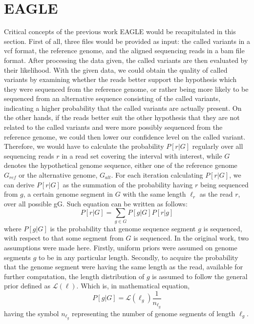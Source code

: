 \documentclass{PHlab-thesis}
\begin{document}
\section{EAGLE}
Critical concepts of the previous work EAGLE would be recapitulated in this section. First of all, three files would be provided as input: the called variants in a vcf format, the reference genome, and the aligned sequencing reads in a bam file format. After processing the data given, the called variants are then evaluated by their likelihood. With the given data, we could obtain the quality of called variants by examining whether the reads better support the hypothesis which they were sequenced from the reference genome, or rather being more likely to be sequenced from an alternative sequence consisting of the called variants, indicating a higher probability that the called variants are actually present. On the other hands, if the reads better suit the other hypothesis that they are not related to the called variants and were more possibly sequenced from the reference genome, we could then lower our confidence level on the called variant. Therefore, we would have to calculate the probability $P[r|G]$ regularly over all sequencing reads $r$ in a read set covering the interval with interest, while $G$ denotes the hypothetical genome sequence, either one of the reference genome $G_{ref}$ or the alternative genome, $G_{alt}$. For each iteration calculating $P[r|G]$, we can derive $P[r|G]$ as the summation of the probability having $r$ being sequenced from $g$, a certain genome segment in $G$ with the same length $\ell_r$ as the read $r$, over all possible {g\in G}. Such equation can be written as follows:
\begin{equation}
P[r|G] = \sum_{g\in G} P[g|G] P[r|g]
\end{equation}
where $P[g|G]$ is the probability that genome sequence segment $g$ is sequenced, with respect to that some segment from $G$ is sequenced. In the original work, two assumptions were made here. Firstly, uniform priors were assumed on genome segments $g$ to be in any particular length. Secondly, to acquire the probability that the genome segment were having the same length as the read, available for further computation, the length distribution of $g$ is assumed to follow the general prior defined as $\mathcal{L}(\ell)$. Which is, in mathematical equation,
\begin{equation}
P[g|G] = \mathcal{L}(\ell_g) \frac{1}{n_{\ell_g}}
\end{equation}
having the symbol $n_{\ell_g}$ representing the number of genome segments of length $\ell_g$.
\end{document}
